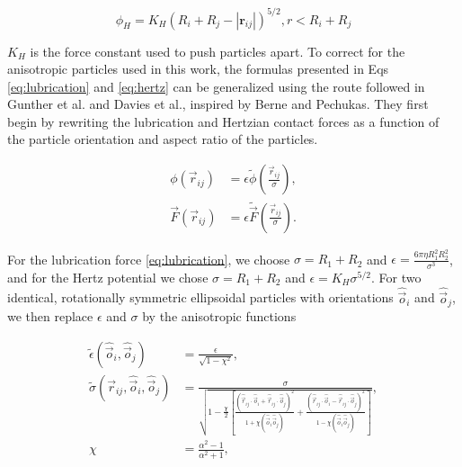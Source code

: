 \begin{equation}
    \phi_{H} = K_{H}(R_i + R_j - |\mathbf{r}_{ij}|)^{5/2}, r < R_i + R_j
    \label{eq:hertz}
\end{equation}

$K_H$ is the force constant used to push particles apart. To correct for the anisotropic particles used in this work, 
the formulas presented in Eqs \ref{eq:lubrication} and \ref{eq:hertz} can be generalized using the route followed 
in Gunther et al. and Davies et al., inspired by Berne and Pechukas. \cite{gunther_timescales_2014, davies_interface_2014} 
They first begin by rewriting the lubrication and Hertzian contact forces as a function of the particle orientation and 
aspect ratio of the particles.

\begin{equation}
    \begin{split}
    \phi(\vec{r}_{ij}) &= {\epsilon} \tilde{\phi}\left(\frac{\vec{r}_{ij}}{{\sigma}}\right) , \\
    \vec{F}(\vec{r}_{ij}) &= {\epsilon} \tilde{\vec{F}}\left(\frac{\vec{r}_{ij}}{{\sigma}}\right) .
    \end{split}
\end{equation}

For the lubrication force \eqref{eq:lubrication}, we choose
${\sigma}=R_1+R_2$ and ${\epsilon}=\frac{6\pi\eta R_1^2 R_2^2}{{\sigma^3}}$, and for the
Hertz potential we chose ${\sigma}=R_1+R_2$ and ${\epsilon}=K_H\sigma^{5/2}$. For two identical, rotationally
symmetric ellipsoidal particles with orientations $\hat{\vec{o}}_i$ and $\hat{\vec{o}}_j$, we then replace $\epsilon$ and $\sigma$ by
the anisotropic functions

\begin{equation}
    \begin{split}
    \tilde\epsilon\left(\hat{\vec{o}}_i, \hat{\vec{o}}_j\right) &= \frac{{\epsilon}}{\sqrt{1-\chi^2}} , \\
    \tilde\sigma\left(\vec{r}_{ij}, \hat{\vec{o}}_i, \hat{\vec{o}}_j\right) &= \frac{{\sigma}}{\sqrt{1-\frac{\chi}{2}\left[ \frac{\left(\hat{\vec{r}}_{ij}\cdot\hat{\vec{o}}_i+\hat{\vec{r}}_{ij}\cdot\hat{\vec{o}}_j\right)^2}{1+\chi\left(\hat{\vec{o}}_i\hat{\vec{o}}_j\right)} + \frac{\left(\hat{\vec{r}}_{ij}\cdot\hat{\vec{o}}_i-\hat{\vec{r}}_{ij}\cdot\hat{\vec{o}}_j\right)^2}{1-\chi\left(\hat{\vec{o}}_i\hat{\vec{o}}_j\right)} \right] }} , \\
    \chi &= \frac{\alpha^2-1}{\alpha^2+1} , \\
    \end{split}
\end{equation}

